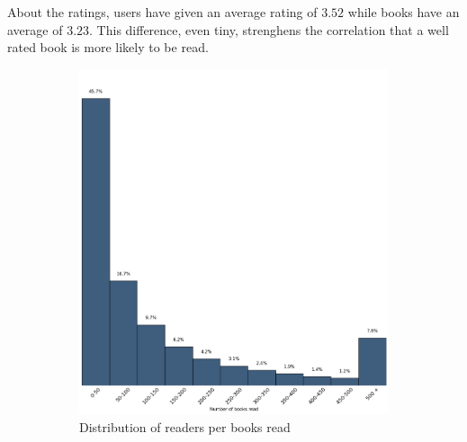 \documentclass[11pt]{article}
\begin{document}
About the ratings, users have given an average rating of $3.52$ while books have an average of $3.23$. This difference, even tiny, strenghens the correlation that a well rated book is more likely to be read.



\begin{figure}
        \centering
        \begin{subfigure}[b]{0.5\textwidth}
                \includegraphics[width=\textwidth]{images/users}
                \caption{Distribution of readers per books read}
                \label{fig:readers_book_read}
        \end{subfigure}%
        ~ %
        \begin{subfigure}[b]{0.5\textwidth}

\end{subfigure}
\end{figure}
\end{document}
